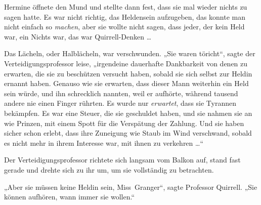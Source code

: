 Hermine öffnete den Mund und stellte dann fest, dass sie mal wieder nichts zu sagen hatte. Es war nicht richtig, das Heldensein aufzugeben, das konnte man nicht einfach so \emph{machen}, aber sie wollte nicht sagen, dass jeder, der kein Held war, ein Nichts war, das war Quirrell-Denken …

Das Lächeln, oder Halblächeln, war verschwunden.
„Sie waren töricht“, sagte der Verteidigungsprofessor leise, „irgendeine dauerhafte Dankbarkeit von denen zu erwarten, die sie zu beschützen versucht haben, sobald sie sich selbst zur Heldin ernannt haben. Genauso wie sie erwarten, dass dieser Mann weiterhin ein Held sein würde, und ihn schrecklich nannten, weil er aufhörte, während tausend andere nie einen Finger rührten. Es wurde nur \emph{erwartet}, dass sie Tyrannen bekämpfen. Es war eine Steuer, die sie geschuldet haben, und sie nahmen sie an wie Prinzen, mit einem Spott für die Verspätung der Zahlung. Und sie haben sicher schon erlebt, dass ihre Zuneigung wie Staub im Wind verschwand, sobald es nicht mehr in ihrem Interesse war, mit ihnen zu verkehren …“

Der Verteidigungsprofessor richtete sich langsam vom Balkon auf, stand fast gerade und drehte sich zu ihr um, um sie vollständig zu betrachten.

„Aber sie müssen keine Heldin sein, Miss~Granger“, sagte Professor Quirrell.
„Sie können aufhören, wann immer sie wollen.“

